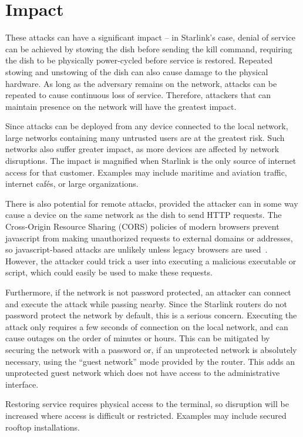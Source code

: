 \section{Impact}\label{sec:impact}

These attacks can have a significant impact -- in Starlink's case, denial of service can be achieved by stowing the dish before sending the kill command, requiring the dish to be physically power-cycled before service is restored.
Repeated stowing and unstowing of the dish can also cause damage to the physical hardware.
As long as the adversary remains on the network, attacks can be repeated to cause continuous loss of service.
Therefore, attackers that can maintain presence on the network will have the greatest impact.

Since attacks can be deployed from any device connected to the local network, large networks containing many untrusted users are at the greatest risk.
Such networks also suffer greater impact, as more devices are affected by network disruptions.
The impact is magnified when Starlink is the only source of internet access for that customer.
Examples may include maritime and aviation traffic, internet cafés, or large organizations.

There is also potential for remote attacks, provided the attacker can in some way cause a device on the same network as the dish to send HTTP requests.
The Cross-Origin Resource Sharing (CORS) policies of modern browsers prevent javascript from making unauthorized requests to external domains or addresses, so javascript-based attacks are unlikely unless legacy browsers are used~\cite{cors}.
However, the attacker could trick a user into executing a malicious executable or script, which could easily be used to make these requests.

Furthermore, if the network is not password protected, an attacker can connect and execute the attack while passing nearby.
Since the Starlink routers do not password protect the network by default, this is a serious concern.
Executing the attack only requires a few seconds of connection on the local network, and can cause outages on the order of minutes or hours.
This can be mitigated by securing the network with a password or, if an unprotected network is absolutely necessary, using the ``guest network'' mode provided by the router.
This adds an unprotected guest network which does not have access to the administrative interface.

Restoring service requires physical access to the terminal, so disruption will be increased where access is difficult or restricted.
Examples may include secured rooftop installations.


